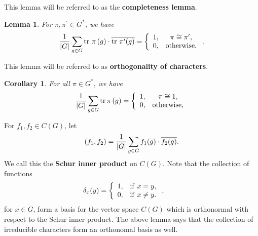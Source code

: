 \documentclass[12pt]{article}
\newtheorem{corollary}[theorem]{Corollary}
\newtheorem{lemma}[theorem]{Lemma}
\begin{document}
This lemma will be referred to as the \textbf{completeness lemma}.

\begin{lemma}
For $\pi ,\pi ^{\prime }\in G^{*}$, we have
\[
{1\over |G|}\sum_{g\in G}\mathrm{tr}\medskip\ \pi\, (g)\cdot \overline{\mathrm{tr}\medskip\ \pi
^{\prime }(g)}=\left\{ 
\begin{array}{cc}
1, &\pi \cong \pi ^{\prime }, \\ 
0, &\mathrm{otherwise}.
\end{array}
\right. .
\]
\end{lemma}

This lemma will be referred to as \textbf{orthogonality of characters}.

\begin{corollary} For all $\pi \in G^*$, we have
\begin{equation}
\label{eq:orthog}
{1\over |G|}\sum_{g\in G} {\rm tr}\,\pi\,(g)
=
\left\{
\begin{array}{cc}
1, & \pi\cong 1,\\
0, & {\rm otherwise},
\end{array}
\right.
\end{equation}
\end{corollary}

For $f_1,f_2\in C(G)$, let
\[
(f_1,f_2)={1\over |G|}\sum_{g\in G}f_1 (g)\cdot \overline{f_2(g)}.
\]
We call this the {\bf Schur inner product} on $C(G)$.
Note that the collection of functions
\[
\delta_x(y)=
\left\{
\begin{array}{cc}
1,& {\rm if }\ x=y,\\
0, & {\rm if}\ x\not=y.
\end{array}
\right. ,\ \ \ \ \ \ \ 
\]
for $x\in G$, 
form a basis for the vector space $C(G)$ which is orthonormal
with respect to the Schur inner product. The above lemma
says that the collection of irreducible characters form an
orthonomal basis as well.
\end{document}
